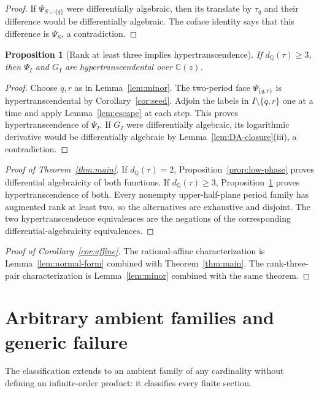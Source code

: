 \documentclass[11pt]{article}
\numberwithin{equation}{section}
\newtheorem{proposition}[theorem]{Proposition}
\theoremstyle{definition}
\theoremstyle{remark}
\newcommand{\C}{\mathbb C}
\newcommand{\Q}{\mathbb Q}
\begin{document}
\begin{proof}
If $\Psi_{S\cup\{q\}}$ were differentially algebraic, then its translate
by $\tau_q$ and their difference would be differentially algebraic.
The coface identity says that this difference is $\Psi_S$, a contradiction.
\end{proof}

\begin{proposition}[Rank at least three implies hypertranscendence]
\label{prop:high-phase}
If $d_\Q(\tau)\geq3$, then $\Psi_I$ and $G_I$ are
hypertranscendental over $\C(z)$.
\end{proposition}

\begin{proof}
Choose $q,r$ as in Lemma~\ref{lem:minor}.  The two-period face
$\Psi_{\{q,r\}}$ is hypertranscendental by Corollary~\ref{cor:seed}.  Adjoin
the labels in $I\setminus\{q,r\}$ one at a time and apply
Lemma~\ref{lem:escape} at each step.  This proves hypertranscendence of
$\Psi_I$.  If $G_I$ were differentially algebraic, its logarithmic
derivative would be differentially algebraic by
Lemma~\ref{lem:DA-closure}(iii), a contradiction.
\end{proof}

\begin{proof}[Proof of Theorem~\ref{thm:main}]
If $d_\Q(\tau)=2$, Proposition~\ref{prop:low-phase} proves differential
algebraicity of both functions.  If $d_\Q(\tau)\geq3$,
Proposition~\ref{prop:high-phase} proves hypertranscendence of both.
Every nonempty upper-half-plane period family has augmented rank at least
two, so the alternatives are exhaustive and disjoint.  The two
hypertranscendence equivalences are the negations of the corresponding
differential-algebraicity equivalences.
\end{proof}

\begin{proof}[Proof of Corollary~\ref{cor:affine}]
The rational-affine characterization is Lemma~\ref{lem:normal-form} combined
with Theorem~\ref{thm:main}.  The rank-three-pair characterization is
Lemma~\ref{lem:minor} combined with the same theorem.
\end{proof}

\section{Arbitrary ambient families and generic failure}
\label{sec:global}

The classification extends to an ambient family of any cardinality without
defining an infinite-order product: it classifies every finite section.
\end{document}
